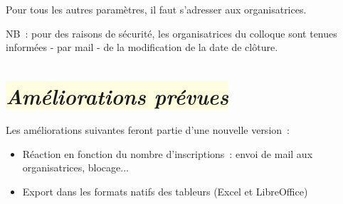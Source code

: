 \documentclass[10pt,a4paper]{article}
\newcommand{\jaunepale}[1]{\colorbox{LightYellow}{#1}}
\begin{document}
Pour tous les autres paramètres, il faut s'adresser aux organisatrices.

NB : pour des raisons de sécurité, les organisatrices du colloque sont tenues informées - par mail - de la modification de la date de clôture.

\section*{\jaunepale{\emph{Améliorations prévues}}}

Les améliorations suivantes feront partie d'une nouvelle version :

\begin{itemize}
  \item Réaction en fonction du nombre d'inscriptions : envoi de mail aux organisatrices, blocage...
  \item Export dans les formats natifs des tableurs (Excel et LibreOffice)
\end{itemize}

 \hfill

\end{document}
